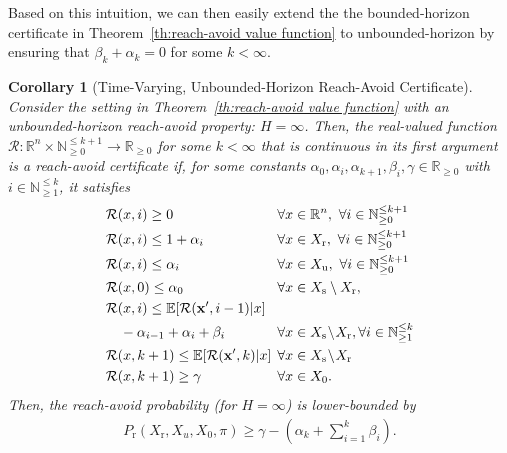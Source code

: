 \documentclass[journal,twoside,web]{ieeecolor}
\newcommand{\unsafe}{\mathrm{u}}
\newcommand{\safe}{\mathrm{s}}
\newcommand{\reach}{\mathrm{r}}
\newcommand{\px}{\mathbf{x}}
\newcommand{\reals}{\mathbb{R}}
\newcommand{\naturals}{\mathbb{N}}
\newcommand{\hor}{H}
\newcommand{\RA}{\mathcal{R}}
\newcommand{\Pinf}{P_{\reach}(X_{\reach}, X_u, X_0, \pi)}
\theoremstyle{definition}
\theoremstyle{plain}
\newtheorem{corollary}[theorem]{Corollary}
\theoremstyle{plain}
\begin{document}
Based on this intuition, we can then easily extend the 
the bounded-horizon certificate in Theorem~\ref{th:reach-avoid value function} to unbounded-horizon by ensuring that $\beta_k+\alpha_k = 0$ for some $k < \infty$.

\begin{corollary}[Time-Varying, Unbounded-Horizon Reach-Avoid Certificate]
\label{corollary:reach-avoid infinite horizon}
    Consider the setting in Theorem~\ref{th:reach-avoid value function} with an unbounded-horizon reach-avoid property: $\hor = \infty$.
    Then, the real-valued function $\RA : \mathbb{R}^n \times \naturals^{\leq k+1}_{\geq 0} \to \mathbb{R}_{\geq 0}$ for some $k < \infty$ that is continuous in its first argument is a \emph{reach-avoid} certificate if, for some constants $\alpha_0, \alpha_i, \alpha_{k+1}, \beta_i,\gamma \in \reals_{\geq 0}$ with $i \in \naturals^{\leq k}_{\geq 1}$, it satisfies 
    \begin{subequations}
        \begin{align}
            \!\!\!\!\!&\RA(x, i) \geq 0 && \hspace{-2mm} \forall x \in \mathbb{R}^n, \ \forall i \in \naturals^{\leq k+1}_{\geq 0} \label{tv-bounded-1} \\
            &\RA(x, i) \leq 1 + \alpha_i && \hspace{-2mm} \forall x \in X_\reach, \ \forall i \in \naturals^{\leq k+1}_{\geq 0}  \label{tv-bounded-2} \\
            &\RA(x, i) \leq \alpha_i && \hspace{-2mm} \forall x \in X_\unsafe, \ \forall i \in \naturals^{\leq k+1}_{\geq 0} \label{tv-bounded-3}  \\ 
            &\RA(x, 0) \leq \alpha_0 && \hspace{-2mm}\forall x \in X_\safe\setminus X_\reach,  \label{tv-bounded-4} \\
            &\RA(x, i) \leq \mathbb{E}[\RA(\px', i-1)|x]  && \nonumber \\
            &  \quad - \alpha_{i-1} + \alpha_i + \beta_i 
                \!\!\! && \hspace{-2mm} \forall x \in X_\safe \! \setminus \! X_\reach,  \forall i \in \naturals^{\leq k}_{\geq 1} \label{tv-bounded-5} \\
            &\RA(x, k+1) \leq \mathbb{E}[\RA(\px', k)|x]  && \hspace{-2mm} \forall x \in X_\safe \! \setminus \! X_\reach \label{tv-bounded-6} \\
            &\RA(x, k+1) \geq \gamma && \hspace{-2mm} \forall x \in X_0. \label{tv-bounded-7} 
        \end{align}
    \end{subequations}
    Then, the  reach-avoid probability (for $H = \infty$) is lower-bounded by
    \begin{align}
        \label{eq: probability bound for TV infinite reach-avoid}
        \Pinf \geq \gamma - \left( \alpha_{k} + \sum_{i=1}^{ k} \beta_i \right ).
    \end{align}  
\end{corollary}
\end{document}

